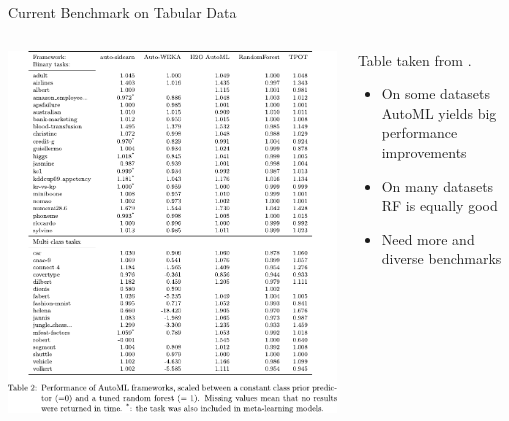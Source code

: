 \begin{frame}{Current Benchmark on Tabular Data}
  \begin{columns}
    \begin{column}{0.43\textwidth}
      \vspace{-0.7cm}
      \begin{center}
        \includegraphics[width = \textwidth]{images/gijsbers_open_2019_tab2.pdf}
      \end{center}
    \end{column}%
    \begin{column}{0.57\textwidth}
      Table taken from .

      \begin{itemize}
        \item On some datasets AutoML yields big performance improvements
        \item On many datasets RF is equally good
        \item Need more and diverse benchmarks
      \end{itemize}

    \end{column}
  \end{columns}
\end{frame}

